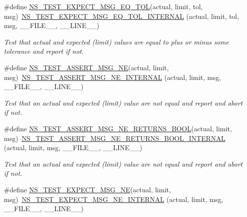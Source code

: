 \begin{DoxyCompactItemize}
\#define \hyperlink{group__testing_ga7927b376d1fed5e576c7a3d69d26e8a0}{N\+S\+\_\+\+T\+E\+S\+T\+\_\+\+E\+X\+P\+E\+C\+T\+\_\+\+M\+S\+G\+\_\+\+E\+Q\+\_\+\+T\+OL}(actual,  limit,  tol,  msg)~\hyperlink{group__testingimpl_ga831cf7f3b988d2759f9c1b72f0a1bd5c}{N\+S\+\_\+\+T\+E\+S\+T\+\_\+\+E\+X\+P\+E\+C\+T\+\_\+\+M\+S\+G\+\_\+\+E\+Q\+\_\+\+T\+O\+L\+\_\+\+I\+N\+T\+E\+R\+N\+AL} (actual, limit, tol, msg, \+\_\+\+\_\+\+F\+I\+L\+E\+\_\+\+\_\+, \+\_\+\+\_\+\+L\+I\+N\+E\+\_\+\+\_\+)
\begin{DoxyCompactList}\small\item\em Test that actual and expected (limit) values are equal to plus or minus some tolerance and report if not. \end{DoxyCompactList}\item 
\#define \hyperlink{group__testing_ga73d66fb0050a5111453fd144e767b91a}{N\+S\+\_\+\+T\+E\+S\+T\+\_\+\+A\+S\+S\+E\+R\+T\+\_\+\+M\+S\+G\+\_\+\+NE}(actual,  limit,  msg)~\hyperlink{group__testingimpl_ga2eea3c446afc92efe1d3c3bcf3fcf2b8}{N\+S\+\_\+\+T\+E\+S\+T\+\_\+\+A\+S\+S\+E\+R\+T\+\_\+\+M\+S\+G\+\_\+\+N\+E\+\_\+\+I\+N\+T\+E\+R\+N\+AL} (actual, limit, msg, \+\_\+\+\_\+\+F\+I\+L\+E\+\_\+\+\_\+, \+\_\+\+\_\+\+L\+I\+N\+E\+\_\+\+\_\+)
\begin{DoxyCompactList}\small\item\em Test that an actual and expected (limit) value are not equal and report and abort if not. \end{DoxyCompactList}\item 
\#define \hyperlink{group__testing_gaa4fda41a38a289730206f1f77d5c10ef}{N\+S\+\_\+\+T\+E\+S\+T\+\_\+\+A\+S\+S\+E\+R\+T\+\_\+\+M\+S\+G\+\_\+\+N\+E\+\_\+\+R\+E\+T\+U\+R\+N\+S\+\_\+\+B\+O\+OL}(actual,  limit,  msg)~\hyperlink{group__testingimpl_ga3c64f96a4a23d84a1212da8cbbf4b326}{N\+S\+\_\+\+T\+E\+S\+T\+\_\+\+A\+S\+S\+E\+R\+T\+\_\+\+M\+S\+G\+\_\+\+N\+E\+\_\+\+R\+E\+T\+U\+R\+N\+S\+\_\+\+B\+O\+O\+L\+\_\+\+I\+N\+T\+E\+R\+N\+AL} (actual, limit, msg, \+\_\+\+\_\+\+F\+I\+L\+E\+\_\+\+\_\+, \+\_\+\+\_\+\+L\+I\+N\+E\+\_\+\+\_\+)
\begin{DoxyCompactList}\small\item\em Test that an actual and expected (limit) value are not equal and report and abort if not. \end{DoxyCompactList}\item 
\#define \hyperlink{group__testing_ga6d4b162d26b8a930115b97dd5f3d9ed9}{N\+S\+\_\+\+T\+E\+S\+T\+\_\+\+E\+X\+P\+E\+C\+T\+\_\+\+M\+S\+G\+\_\+\+NE}(actual,  limit,  msg)~\hyperlink{group__testingimpl_gad5555f4342248139af34e13a31ce7827}{N\+S\+\_\+\+T\+E\+S\+T\+\_\+\+E\+X\+P\+E\+C\+T\+\_\+\+M\+S\+G\+\_\+\+N\+E\+\_\+\+I\+N\+T\+E\+R\+N\+AL} (actual, limit, msg, \+\_\+\+\_\+\+F\+I\+L\+E\+\_\+\+\_\+, \+\_\+\+\_\+\+L\+I\+N\+E\+\_\+\+\_\+)

\end{DoxyCompactItemize}
